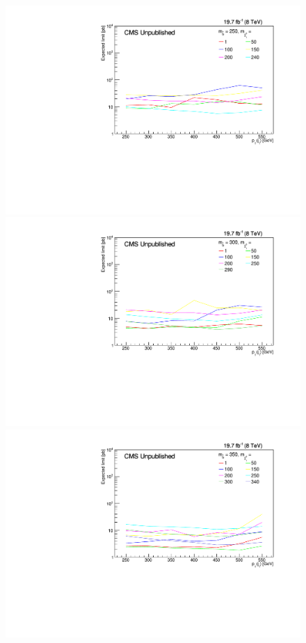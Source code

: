 \begin{figure}[!Hhtb]
\begin{center}
  \includegraphics[scale=0.35]{Figures/sus13009/limitplots/plots/sbottom/expected_250.pdf}
  \includegraphics[scale=0.35]{Figures/sus13009/limitplots/plots/sbottom/expected_300.pdf} 
  \includegraphics[scale=0.35]{Figures/sus13009/limitplots/plots/sbottom/expected_350.pdf} 

\end{center}
\end{figure}
